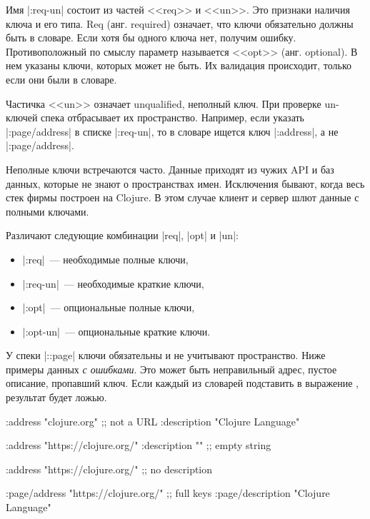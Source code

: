 Имя \spverb|:req-un| состоит из частей <<req>> и <<un>>. Это признаки наличия
ключа и его типа. Req (анг. required) означает, что ключи обязательно должны
быть в словаре. Если хотя бы одного ключа нет, получим ошибку. Противоположный
по смыслу параметр называется <<opt>> (анг. optional). В нем указаны ключи,
которых может не быть. Их валидация происходит, только если они были в словаре.


Частичка <<un>> означает unqualified, неполный ключ. При проверке un-ключей
спека отбрасывает их пространство. Например, если указать \spverb|:page/address|
в списке \spverb|:req-un|, то в словаре ищется ключ \spverb|:address|, а не
\spverb|:page/address|.

Неполные ключи встречаются часто. Данные приходят из чужих API и баз данных,
которые не знают о пространствах имен. Исключения бывают, когда весь стек фирмы
построен на Clojure. В этом случае клиент и сервер шлют данные с полными
ключами.

Различают следующие комбинации \spverb|req|, \spverb|opt| и \spverb|un|:

\begin{itemize}

\item
  \spverb|:req|~--- необходимые полные ключи,

\item
  \spverb|:req-un|~--- необходимые краткие ключи,


\item
  \spverb|:opt|~--- опциональные полные ключи,


\item
  \spverb|:opt-un|~--- опциональные краткие ключи.

\end{itemize}

У спеки \spverb|::page| ключи обязательны и не учитывают пространство. Ниже
примеры данных \emph{с ошибками}. Это может быть неправильный адрес, пустое
описание, пропавший ключ. Если каждый из словарей подставить в выражение
, результат будет ложью.

\begin{english}
  \begin{clojure}
{:address "clojure.org" ;; not a URL
 :description "Clojure Language"}

{:address "https://clojure.org/"
 :description ""} ;; empty string

{:address "https://clojure.org/"} ;; no description

{:page/address "https://clojure.org/" ;; full keys
 :page/description "Clojure Language"}
  \end{clojure}
\end{english}

